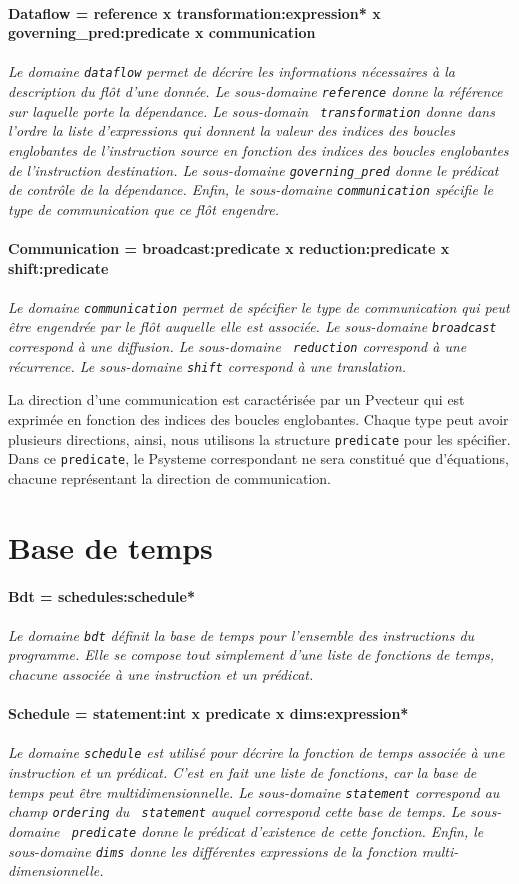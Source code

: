 \documentclass{article}
\newcommand{\domain}[2]{\paragraph{{#1}}\paragraph{}{\em #2}}
\begin{document}
\domain{Dataflow = reference x transformation:expression* x governing\_pred:predicate x communication}
{Le domaine {\tt dataflow} permet de d\'ecrire les informations n\'ecessaires 
\`a la description du fl\^ot d'une donn\'ee. Le sous-domaine {\tt reference} 
donne la r\'ef\'erence sur laquelle porte la d\'ependance. Le sous-domain {\tt 
transformation} donne dans l'ordre la liste d'expressions qui donnent la valeur
des indices des boucles englobantes de l'instruction source en fonction des 
indices des boucles englobantes de l'instruction destination. Le sous-domaine 
{\tt governing\_pred} donne le pr\'edicat de contr\^ole de la d\'ependance. 
Enfin, le sous-domaine {\tt communication} sp\'ecifie le type de communication 
que ce fl\^ot engendre.}

\domain{Communication = broadcast:predicate x reduction:predicate x shift:predicate}
{Le domaine {\tt communication} permet de sp\'ecifier le type de communication 
qui peut \^etre engendr\'ee par le fl\^ot auquelle elle est associ\'ee. Le 
sous-domaine {\tt broadcast} correspond \`a une diffusion. Le sous-domaine {\tt
reduction} correspond \`a une r\'ecurrence. Le sous-domaine {\tt shift} 
correspond \`a une translation.

La direction d'une communication est caract\'eris\'ee par un Pvecteur qui est 
exprim\'ee en fonction des indices des boucles englobantes. Chaque type peut 
avoir plusieurs directions, ainsi, nous utilisons la structure {\tt predicate} 
pour les sp\'ecifier. Dans ce {\tt predicate}, le Psysteme correspondant ne 
sera constitu\'e que d'\'equations, chacune repr\'esentant la direction de 
communication.}

\section{Base de temps}

\domain{Bdt = schedules:schedule*}
{Le domaine {\tt bdt} d\'efinit la base de temps pour l'ensemble des 
instructions du programme. Elle se compose tout simplement d'une liste de 
fonctions de temps, chacune associ\'ee \`a une instruction et un pr\'edicat.}

\domain{Schedule = statement:int x predicate x dims:expression*}
{Le domaine {\tt schedule} est utilis\'e pour d\'ecrire la fonction de temps 
associ\'ee \`a une instruction et un pr\'edicat. C'est en fait une liste de 
fonctions, car la base de temps peut \^etre multidimensionnelle. Le 
sous-domaine {\tt statement} correspond au champ {\tt ordering} du {\tt 
statement} auquel correspond cette base de temps. Le sous-domaine {\tt 
predicate} donne le pr\'edicat d'existence de cette fonction. Enfin, le 
sous-domaine {\tt dims} donne les diff\'erentes expressions de la fonction 
multi-dimensionnelle.}
\end{document}
